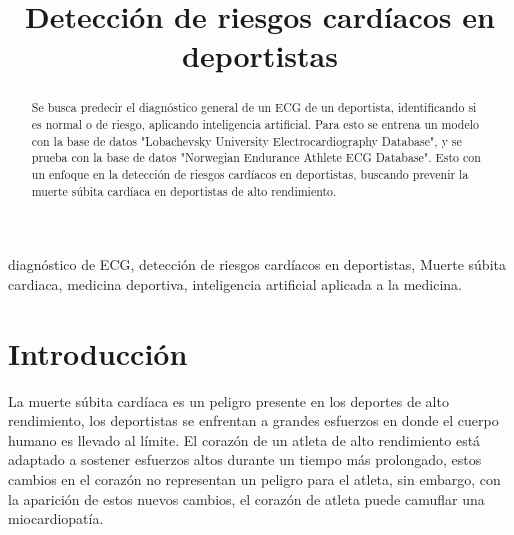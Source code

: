 \documentclass[conference]{IEEEtran}
\begin{document}
\title{Detección de riesgos cardíacos en deportistas\\
}

\author{
\and 
{}
}

\maketitle

\begin{abstract}
Se busca predecir el diagnóstico general de un ECG de un deportista, 
identificando si es normal o de riesgo, aplicando inteligencia artificial.
Para esto se entrena un modelo con la base de datos "Lobachevsky University Electrocardiography Database", 
y se prueba con la base de datos "Norwegian Endurance Athlete ECG Database".
Esto con un enfoque en la detección de riesgos cardíacos en deportistas, 
buscando prevenir la muerte súbita cardíaca en deportistas de alto rendimiento.

\end{abstract}

\begin{IEEEkeywords}
diagnóstico de ECG, detección de riesgos cardíacos en deportistas, Muerte súbita cardiaca, 
medicina deportiva, inteligencia artificial aplicada a la medicina.
\end{IEEEkeywords}

\section{Introducción}
La muerte súbita cardíaca es un peligro presente en los deportes de alto rendimiento, los deportistas
 se enfrentan a grandes esfuerzos en donde el cuerpo humano es llevado al límite. El corazón de un atleta
  de alto rendimiento está adaptado a sostener esfuerzos altos durante un tiempo más prolongado, estos 
  cambios en el corazón no representan un peligro para el atleta, sin embargo, con la aparición de estos 
  nuevos cambios, el corazón de atleta puede camuflar una miocardiopatía.
\end{document}
